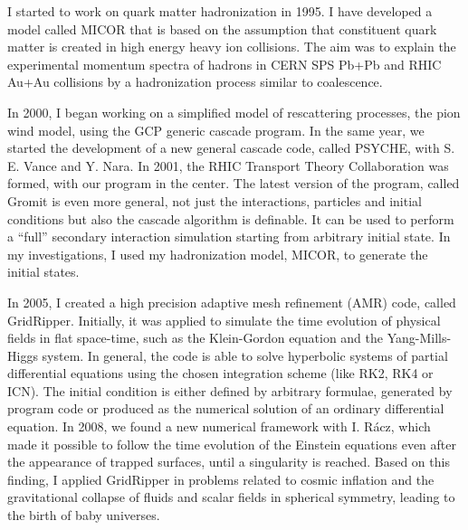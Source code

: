 \documentclass{article}[12pt]
\begin{document}
I started to work on quark matter hadronization in 1995. I have developed a
model called MICOR that is based on the assumption that constituent quark
matter is created in high energy heavy ion collisions. The aim was to explain
the experimental momentum spectra of hadrons in CERN SPS Pb+Pb and RHIC Au+Au
collisions by a hadronization process similar to coalescence.

In 2000, I began working on a simplified model of rescattering processes, the
pion wind model, using the GCP generic cascade program. In the same year, we
started the development of a new general cascade code, called PSYCHE, with S.
E. Vance and Y. Nara.  In 2001, the RHIC Transport Theory Collaboration was
formed, with our program in the center. The latest version of the program,
called Gromit is even more general, not just the interactions, particles and
initial conditions but also the cascade algorithm is definable.
It can be used to perform a ``full'' secondary interaction simulation starting
from arbitrary initial state. In my investigations, I used my hadronization
model, MICOR, to generate the initial states.

In 2005, I created a high precision adaptive mesh refinement (AMR) code,
called GridRipper. Initially, it was
applied to simulate the time evolution of physical fields in flat space-time,
such as the Klein-Gordon equation and the Yang-Mills-Higgs system. In general,
the code is able to solve hyperbolic systems of partial differential equations
using the chosen integration scheme (like RK2, RK4 or ICN). The initial
condition is either defined by arbitrary formulae, generated by program
code or produced as the numerical solution of an ordinary differential
equation. In 2008, we found a new numerical framework with I. R{\'a}cz,
which made it possible to follow the time evolution of the Einstein equations
even after the appearance of trapped surfaces, until a singularity is reached.
Based on this finding, I applied GridRipper in problems related to cosmic
inflation and the gravitational collapse of fluids and scalar fields in
spherical symmetry, leading to the birth of baby universes.
\end{document}
